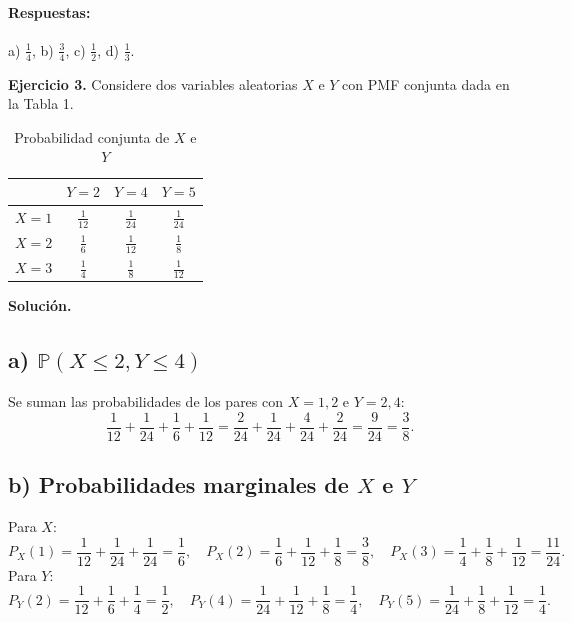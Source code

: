 \documentclass[letterpaper, 12pt]{article}
\begin{document}
    \paragraph*{Respuestas:} a) \(\frac{1}{4}\), b) \(\frac{3}{4}\), c) \(\frac{1}{2}\), d) \(\frac{1}{3}\).
    
    \newpage

    \textbf{Ejercicio 3.} Considere dos variables aleatorias \( X \) e \( Y \) con PMF conjunta dada en la Tabla 1.

    \begin{table}[h]
    \centering
    \renewcommand{\arraystretch}{1.5}
    \begin{tabular}{cccc}
    \hline
    & \(Y = 2\) & \(Y = 4\) & \(Y = 5\) \\
    \hline
    \(X = 1\) & \(\frac{1}{12}\) & \(\frac{1}{24}\) & \(\frac{1}{24}\) \\
    \(X = 2\) & \(\frac{1}{6}\) & \(\frac{1}{12}\) & \(\frac{1}{8}\) \\
    \(X = 3\) & \(\frac{1}{4}\) & \(\frac{1}{8}\) & \(\frac{1}{12}\) \\
    \hline
    \end{tabular}
    \caption{Probabilidad conjunta de \(X\) e \(Y\)}
    \end{table}
    \textbf{Solución.}

    \subsection*{a) \(\mathbb{P}(X \leq 2, Y \leq 4)\)}
    Se suman las probabilidades de los pares con \(X=1,2\) e \(Y=2,4\):
    \[
    \frac{1}{12} + \frac{1}{24} + \frac{1}{6} + \frac{1}{12} = \frac{2}{24} + \frac{1}{24} + \frac{4}{24} + \frac{2}{24} = \frac{9}{24} = \frac{3}{8}.
    \]

    \subsection*{b) Probabilidades marginales de \(X\) e \(Y\)}
    Para \(X\):
    \[
    P_X(1)=\frac{1}{12}+\frac{1}{24}+\frac{1}{24}=\frac{1}{6},\quad
    P_X(2)=\frac{1}{6}+\frac{1}{12}+\frac{1}{8}=\frac{3}{8},\quad
    P_X(3)=\frac{1}{4}+\frac{1}{8}+\frac{1}{12}=\frac{11}{24}.
    \]
    Para \(Y\):
    \[
    P_Y(2)=\frac{1}{12}+\frac{1}{6}+\frac{1}{4}=\frac{1}{2},\quad
    P_Y(4)=\frac{1}{24}+\frac{1}{12}+\frac{1}{8}=\frac{1}{4},\quad
    P_Y(5)=\frac{1}{24}+\frac{1}{8}+\frac{1}{12}=\frac{1}{4}.
    \]
\end{document}
